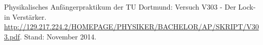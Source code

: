 \begin{thebibliography}{9}
   Physikalisches Anfängerpraktikum der TU Dortmund: Versuch V303 - Der Lock-in Verstärker. \url{http://129.217.224.2/HOMEPAGE/PHYSIKER/BACHELOR/AP/SKRIPT/V303.pdf}. Stand: November 2014.
\end{thebibliography}
